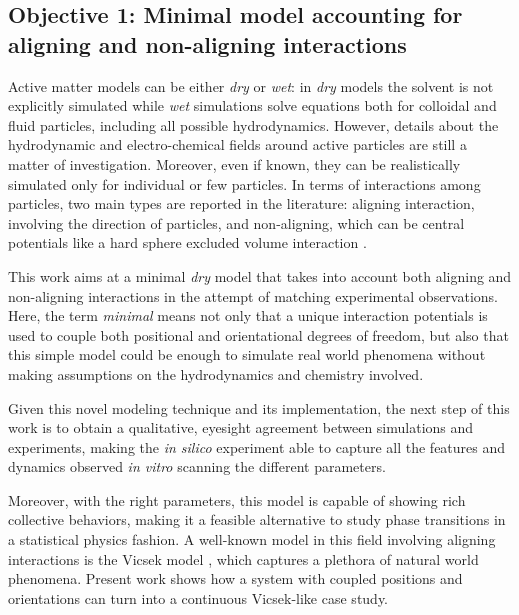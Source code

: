 \documentclass[../../master_thesis_np.tex]{subfiles}
\begin{document}
	\subsection{Objective 1: Minimal model accounting for aligning and non-aligning interactions}
	Active matter models can be either \emph{dry} or \emph{wet}: in \emph{dry} models the solvent is not explicitly simulated while \emph{wet} simulations solve equations both for colloidal and fluid particles, including all possible hydrodynamics. 
	However, details about the hydrodynamic and electro-chemical fields around active particles are still a matter of investigation.
	Moreover, even if known, they can be realistically simulated only for individual or few particles.
	In terms of interactions among particles, two main types are reported in the literature: aligning interaction, involving the direction of particles, and non-aligning, which can be central potentials like a hard sphere excluded volume interaction \cite{callegari_numerical_2019}.
	
	This work aims at a minimal \emph{dry} model that takes into account both aligning and non-aligning interactions in the attempt of matching experimental observations.
	Here, the term \emph{minimal} means not only that a unique interaction potentials is used to couple both positional and orientational degrees of freedom, but also that this simple model could be enough to simulate real world phenomena without making assumptions on the hydrodynamics and chemistry involved. 
		
	Given this novel modeling technique and its implementation, the next step of this work is to obtain a qualitative, eyesight agreement between simulations and experiments, making the \emph{in silico} experiment able to capture all the features and dynamics observed \emph{in vitro} scanning the different parameters.
	
	Moreover, with the right parameters, this model is capable of showing rich collective behaviors, making it a feasible alternative to study phase transitions in a statistical physics fashion. 
	A well-known model in this field involving aligning interactions is the Vicsek model \cite{vicsek_novel_1995}, which captures a plethora of natural world phenomena. 
	Present work shows how a system with coupled positions and orientations can turn into a continuous Vicsek-like case study.
	
\end{document}
